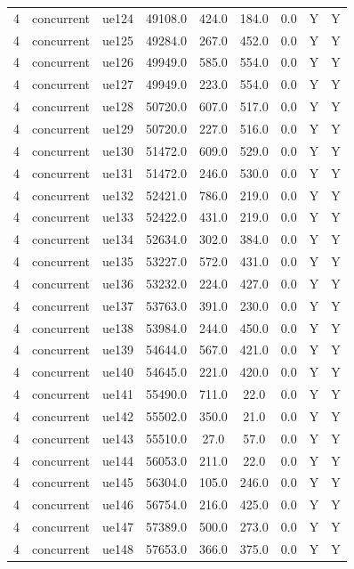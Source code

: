 \begin{table}[ht]
\begin{tabular}{|c|c|c|c|c|c|c|c|c|}
4 & concurrent & ue124 & 49108.0 & 424.0 & 184.0 & 0.0 & Y & Y \\
4 & concurrent & ue125 & 49284.0 & 267.0 & 452.0 & 0.0 & Y & Y \\
4 & concurrent & ue126 & 49949.0 & 585.0 & 554.0 & 0.0 & Y & Y \\
4 & concurrent & ue127 & 49949.0 & 223.0 & 554.0 & 0.0 & Y & Y \\
4 & concurrent & ue128 & 50720.0 & 607.0 & 517.0 & 0.0 & Y & Y \\
4 & concurrent & ue129 & 50720.0 & 227.0 & 516.0 & 0.0 & Y & Y \\
4 & concurrent & ue130 & 51472.0 & 609.0 & 529.0 & 0.0 & Y & Y \\
4 & concurrent & ue131 & 51472.0 & 246.0 & 530.0 & 0.0 & Y & Y \\
4 & concurrent & ue132 & 52421.0 & 786.0 & 219.0 & 0.0 & Y & Y \\
4 & concurrent & ue133 & 52422.0 & 431.0 & 219.0 & 0.0 & Y & Y \\
4 & concurrent & ue134 & 52634.0 & 302.0 & 384.0 & 0.0 & Y & Y \\
4 & concurrent & ue135 & 53227.0 & 572.0 & 431.0 & 0.0 & Y & Y \\
4 & concurrent & ue136 & 53232.0 & 224.0 & 427.0 & 0.0 & Y & Y \\
4 & concurrent & ue137 & 53763.0 & 391.0 & 230.0 & 0.0 & Y & Y \\
4 & concurrent & ue138 & 53984.0 & 244.0 & 450.0 & 0.0 & Y & Y \\
4 & concurrent & ue139 & 54644.0 & 567.0 & 421.0 & 0.0 & Y & Y \\
4 & concurrent & ue140 & 54645.0 & 221.0 & 420.0 & 0.0 & Y & Y \\
4 & concurrent & ue141 & 55490.0 & 711.0 & 22.0 & 0.0 & Y & Y \\
4 & concurrent & ue142 & 55502.0 & 350.0 & 21.0 & 0.0 & Y & Y \\
4 & concurrent & ue143 & 55510.0 & 27.0 & 57.0 & 0.0 & Y & Y \\
4 & concurrent & ue144 & 56053.0 & 211.0 & 22.0 & 0.0 & Y & Y \\
4 & concurrent & ue145 & 56304.0 & 105.0 & 246.0 & 0.0 & Y & Y \\
4 & concurrent & ue146 & 56754.0 & 216.0 & 425.0 & 0.0 & Y & Y \\
4 & concurrent & ue147 & 57389.0 & 500.0 & 273.0 & 0.0 & Y & Y \\
4 & concurrent & ue148 & 57653.0 & 366.0 & 375.0 & 0.0 & Y & Y \\

\end{tabular}
\end{table}
